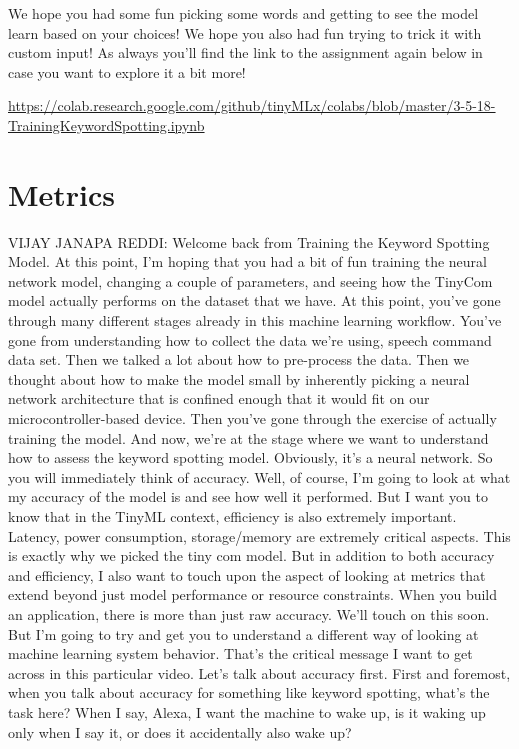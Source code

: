 We hope you had some fun picking some words and getting to see the model learn based on your choices! We hope you also had fun trying to trick it with custom input! As always you’ll find the link to the assignment again below in case you want to explore it a bit more!

\url{https://colab.research.google.com/github/tinyMLx/colabs/blob/master/3-5-18-TrainingKeywordSpotting.ipynb}

\section{Metrics}

VIJAY JANAPA REDDI: Welcome back from Training the Keyword Spotting Model.
At this point, I'm hoping that you had a bit of fun
training the neural network model, changing a couple of parameters,
and seeing how the TinyCom model actually performs on the dataset
that we have.
At this point, you've gone through many different stages
already in this machine learning workflow.
You've gone from understanding how to collect the data we're using,
speech command data set.
Then we talked a lot about how to pre-process the data.
Then we thought about how to make the model small by inherently picking
a neural network architecture that is confined enough that it would fit
on our microcontroller-based device.
Then you've gone through the exercise of actually training the model.
And now, we're at the stage where we want to understand how
to assess the keyword spotting model.
Obviously, it's a neural network.
So you will immediately think of accuracy.
Well, of course, I'm going to look at what my accuracy of the model
is and see how well it performed.
But I want you to know that in the TinyML context,
efficiency is also extremely important.
Latency, power consumption, storage/memory
are extremely critical aspects.
This is exactly why we picked the tiny com model.
But in addition to both accuracy and efficiency,
I also want to touch upon the aspect of looking
at metrics that extend beyond just model performance or resource constraints.
When you build an application, there is more than just raw accuracy.
We'll touch on this soon.
But I'm going to try and get you to understand a different way of looking
at machine learning system behavior.
That's the critical message I want to get across in this particular video.
Let's talk about accuracy first.
First and foremost, when you talk about accuracy for something
like keyword spotting, what's the task here?
When I say, Alexa, I want the machine to wake up,
is it waking up only when I say it, or does it accidentally also wake up?
